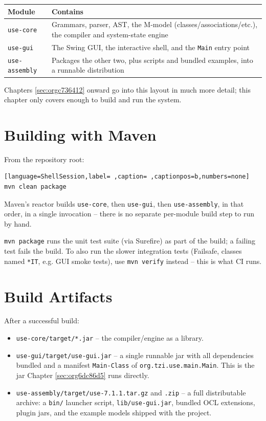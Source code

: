 \documentclass[11pt,twoside,a4paper]{book}
\begin{document}
\begin{center}
\begin{tabular}{lp{10cm}}
Module & Contains\\[0pt]
\hline
\texttt{use-core} & Grammars, parser, AST, the M-model (classes/associations/etc.), the compiler and system-state engine\\[0pt]
\texttt{use-gui} & The Swing GUI, the interactive shell, and the \texttt{Main} entry point\\[0pt]
\texttt{use-assembly} & Packages the other two, plus scripts and bundled examples, into a runnable distribution\\[0pt]
\end{tabular}
\end{center}

Chapters \ref{sec:orgc736412} onward go into this layout in much more
detail; this chapter only covers enough to build and run the system.

\section{Building with Maven}
\label{sec:org2671558}
From the repository root:

\begin{lstlisting}[language=ShellSession,label= ,caption= ,captionpos=b,numbers=none]
mvn clean package
\end{lstlisting}

Maven's reactor builds \texttt{use-core}, then \texttt{use-gui}, then
\texttt{use-assembly}, in that order, in a single invocation -- there is no
separate per-module build step to run by hand.

\begin{manualnote}
\texttt{mvn package} runs the unit test suite (via Surefire) as part of the
build; a failing test fails the build. To also run the slower
integration tests (Failsafe, classes named \texttt{*IT}, e.g. GUI smoke
tests), use \texttt{mvn verify} instead -- this is what CI runs.
\end{manualnote}

\section{Build Artifacts}
\label{sec:org398e54b}
After a successful build:

\begin{itemize}
\item \texttt{use-core/target/*.jar} -- the compiler/engine as a library.
\item \texttt{use-gui/target/use-gui.jar} -- a single runnable jar with all
dependencies bundled and a manifest \texttt{Main-Class} of
\texttt{org.tzi.use.main.Main}. This is the jar Chapter
\ref{sec:org6dc86d5} runs directly.
\item \texttt{use-assembly/target/use-7.1.1.tar.gz} and \texttt{.zip} -- a full
distributable archive: a \texttt{bin/} launcher script, \texttt{lib/use-gui.jar},
bundled OCL extensions, plugin jars, and the example models shipped
with the project.
\end{itemize}
\end{document}
